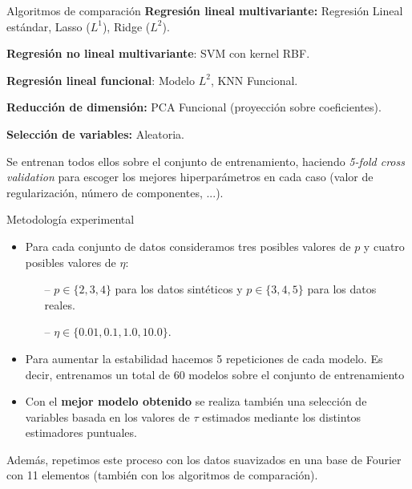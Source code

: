\documentclass[10pt, english, professionalfonts]{beamer}
\begin{document}
\begin{frame}{Algoritmos de comparación}
  \textbf{Regresión lineal multivariante:} Regresión Lineal estándar, Lasso (\(L^1\)), Ridge (\(L^2\)).

  \textbf{Regresión no lineal multivariante}: SVM con kernel RBF.

  \textbf{Regresión lineal funcional}: Modelo \(L^2\), KNN Funcional.

  \textbf{Reducción de dimensión:} PCA Funcional (proyección sobre coeficientes).

  \textbf{Selección de variables:} Aleatoria.

  \vspace{1em}

  Se entrenan todos ellos sobre el conjunto de entrenamiento, haciendo \textit{5-fold cross validation} para escoger los mejores hiperparámetros en cada caso (valor de regularización, número de componentes, ...).
\end{frame}

\begin{frame}{Metodología experimental}
  \begin{itemize}
  \item Para cada conjunto de datos consideramos tres posibles valores de \(p\) y cuatro posibles valores de \(\eta\):
  \begin{itemize}
    \item[--] \(p\in \{2,3,4\}\) para los datos sintéticos y \(p\in \{3, 4, 5\}\) para los datos reales.
      \item[--] \(\eta \in \{0.01, 0.1, 1.0, 10.0\}\).
  \end{itemize}

  \item Para aumentar la estabilidad hacemos 5 repeticiones de cada modelo. Es decir, entrenamos un total de 60 modelos sobre el conjunto de entrenamiento

  \item Con el \textbf{mejor modelo obtenido} se realiza también una selección de variables basada en los valores de \(\tau\) estimados mediante los distintos estimadores puntuales.
\end{itemize}

Además, repetimos este proceso con los datos suavizados en una base de Fourier con 11 elementos (también con los algoritmos de comparación).
\end{frame}
\end{document}
